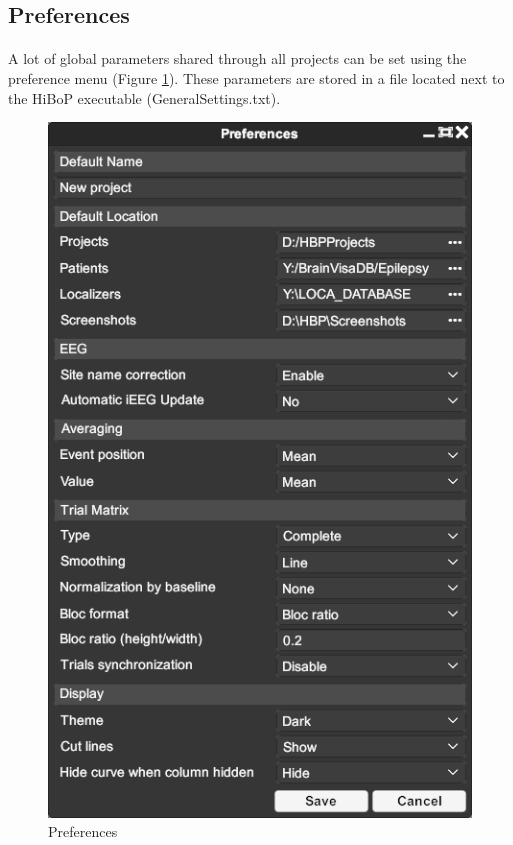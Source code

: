 \documentclass[a4paper]{article}
\begin{document}
\subsection{Preferences}\label{preferences}
\paragraph{} A lot of global parameters shared through all projects can be set using the preference menu (Figure \ref{preferencesUI}). These parameters are stored in a file located next to the HiBoP executable (GeneralSettings.txt).
\begin{figure}[H]
\begin{center}
\includegraphics[scale=0.5]{Preferences.png}
\end{center}
\caption{\label{preferencesUI}Preferences}
\end{figure}
\end{document}
